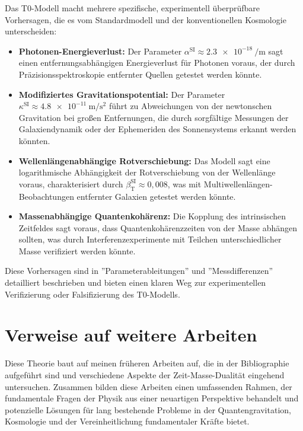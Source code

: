 \documentclass[a4paper,12pt]{article}
\newcommand{\betaT}{\beta_{\text{T}}}
\begin{document}
	Das T0-Modell macht mehrere spezifische, experimentell überprüfbare Vorhersagen, die es vom Standardmodell und der konventionellen Kosmologie unterscheiden:
	
	\begin{itemize}
		\item \textbf{Photonen-Energieverlust:} Der Parameter \(\alpha^{\text{SI}} \approx \SI{2,3e-18}{\per\meter}\) sagt einen entfernungsabhängigen Energieverlust für Photonen voraus, der durch Präzisionsspektroskopie entfernter Quellen getestet werden könnte.
		
		\item \textbf{Modifiziertes Gravitationspotential:} Der Parameter \(\kappa^{\text{SI}} \approx \SI{4,8e-11}{\meter\per\second\squared}\) führt zu Abweichungen von der newtonschen Gravitation bei großen Entfernungen, die durch sorgfältige Messungen der Galaxiendynamik oder der Ephemeriden des Sonnensystems erkannt werden könnten.
		
		\item \textbf{Wellenlängenabhängige Rotverschiebung:} Das Modell sagt eine logarithmische Abhängigkeit der Rotverschiebung von der Wellenlänge voraus, charakterisiert durch \(\betaT^{\text{SI}} \approx 0,008\), was mit Multiwellenlängen-Beobachtungen entfernter Galaxien getestet werden könnte.
		
		\item \textbf{Massenabhängige Quantenkohärenz:} Die Kopplung des intrinsischen Zeitfeldes sagt voraus, dass Quantenkohärenzzeiten von der Masse abhängen sollten, was durch Interferenzexperimente mit Teilchen unterschiedlicher Masse verifiziert werden könnte.
	\end{itemize}
	
	Diese Vorhersagen sind in ''Parameterableitungen'' \cite{pascher_params_2025} und ''Messdifferenzen'' \cite{pascher_messdifferenzen_2025} detailliert beschrieben und bieten einen klaren Weg zur experimentellen Verifizierung oder Falsifizierung des T0-Modells.
	
	\section{Verweise auf weitere Arbeiten}
	
	Diese Theorie baut auf meinen früheren Arbeiten auf, die in der Bibliographie aufgeführt sind und verschiedene Aspekte der Zeit-Masse-Dualität eingehend untersuchen. Zusammen bilden diese Arbeiten einen umfassenden Rahmen, der fundamentale Fragen der Physik aus einer neuartigen Perspektive behandelt und potenzielle Lösungen für lang bestehende Probleme in der Quantengravitation, Kosmologie und der Vereinheitlichung fundamentaler Kräfte bietet.
	
\end{document}
